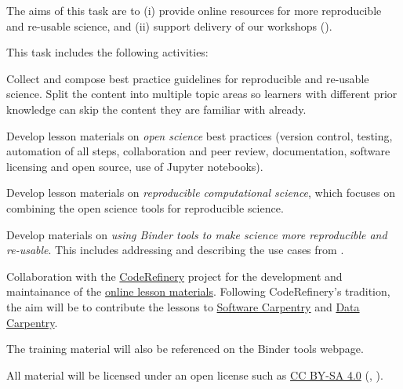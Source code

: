 \begin{task}[
  title=Best practice guidelines for reproducible science,
  id=online-resources,
  lead=UIO,
  PM=10,
  wphases={0-36!.28},
  partners={SRL,MP,UIO}
]
The aims of this task are to (i) provide online resources for more reproducible
and re-usable science, and (ii) support delivery of our workshops
().
  
This task includes the following activities:
  \begin{compactitem}
  \item Collect and compose best practice guidelines for reproducible and
    re-usable science. Split the content into multiple topic areas so learners
    with different prior knowledge can skip the content they are familiar with
    already.
  \item Develop lesson materials on \emph{open science} best practices (version
    control, testing, automation of all steps, collaboration and peer review,
    documentation, software licensing and open source, use of Jupyter
    notebooks).
  \item Develop lesson materials on \emph{reproducible computational science},
    which focuses on combining the open science tools for reproducible science.
  \item Develop materials on \emph{using Binder tools to make science more
      reproducible and re-usable}. This includes addressing and describing the
    use cases from .
  \item Collaboration with the \href{https://coderefinery.org}{CodeRefinery}
    project for the development and maintainance of the
    \href{https://coderefinery.org/lessons/}{online lesson materials}. Following
    CodeRefinery's tradition, the aim will be to contribute the lessons to
    \href{https://software-carpentry.org/}{Software Carpentry} and
    \href{https://data-carpentry.org/}{Data Carpentry}.
  \item The training material will also be referenced on the Binder tools webpage.
  \end{compactitem}
  All material will be licensed under an open license such as
  \href{https://creativecommons.org/licenses/by-sa/4.0/}{CC BY-SA 4.0}
  (, ).
\end{task}
